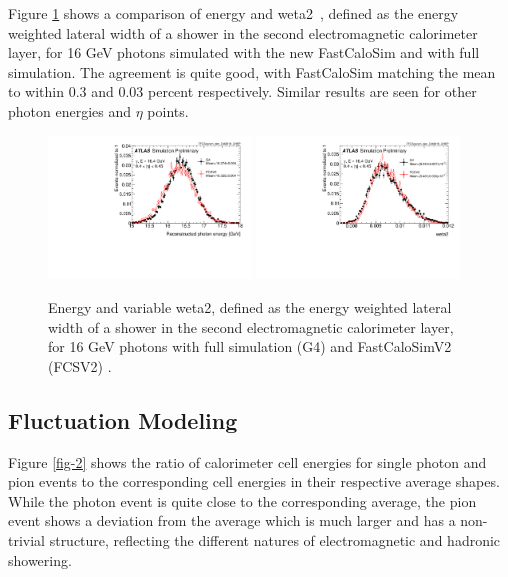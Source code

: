 Figure \ref{fig-1} shows a comparison of energy and weta2~\cite{ATLAS-CONF-2010-077}, defined as the energy weighted lateral width of a 
shower in the second electromagnetic calorimeter layer, for 16 GeV photons simulated with the new FastCaloSim and with full 
\GEANT simulation. The agreement is quite good, with FastCaloSim matching the \GEANT mean to within 0.3 and 0.03 percent 
respectively. Similar results are seen for other photon energies and $\eta$ points.
\begin{figure}[ht!]
\centering
\includegraphics[width=0.48\textwidth]{figures/CHEP-photon-energy.pdf}
\includegraphics[width=0.48\textwidth]{figures/CHEP-photon-weta2.pdf}
\caption{Energy and variable weta2, defined as the energy weighted lateral width of a shower in the second electromagnetic calorimeter layer, for 16 GeV photons with full simulation (G4) and FastCaloSimV2 (FCSV2) \cite{ATL-SOFT-PUB-2018-002}.}
\label{fig-1} 
\end{figure}

\FloatBarrier
\subsection{Fluctuation Modeling}
\label{fluct-modeling}
Figure \ref{fig-2} shows the ratio of calorimeter cell energies for single \GEANT photon and pion events to the corresponding 
cell energies in their respective average shapes. While the photon event is quite close to the corresponding average, the 
pion event shows a deviation from the average which is much larger and has a non-trivial structure, reflecting the different 
natures of electromagnetic and hadronic showering.

